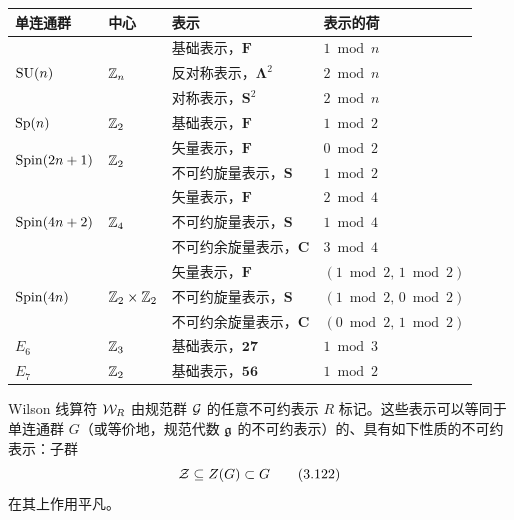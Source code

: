 
\begin{table}[htbp]
\centering
\small
\begin{tabular}{llll}
\toprule
单连通群 & 中心 & 表示 & 表示的荷 \\
\midrule
\multirow{3}{*}{$\mathrm{SU}(n)$} & \multirow{3}{*}{$\mathbb{Z}_n$}
  & 基础表示，$\bm{F}$ & $1 \bmod n$ \\
 & & 反对称表示，$\bm{\Lambda}^2$ & $2 \bmod n$ \\
 & & 对称表示，$\bm{S}^2$ & $2 \bmod n$ \\
\midrule
$\mathrm{Sp}(n)$ & $\mathbb{Z}_2$ & 基础表示，$\bm{F}$ & $1 \bmod 2$ \\
\midrule
\multirow{2}{*}{$\mathrm{Spin}(2n+1)$} & \multirow{2}{*}{$\mathbb{Z}_2$}
  & 矢量表示，$\bm{F}$ & $0 \bmod 2$ \\
 & & 不可约旋量表示，$\bm{S}$ & $1 \bmod 2$ \\
\midrule
\multirow{3}{*}{$\mathrm{Spin}(4n+2)$} & \multirow{3}{*}{$\mathbb{Z}_4$}
  & 矢量表示，$\bm{F}$ & $2 \bmod 4$ \\
 & & 不可约旋量表示，$\bm{S}$ & $1 \bmod 4$ \\
 & & 不可约余旋量表示，$\bm{C}$ & $3 \bmod 4$ \\
\midrule
\multirow{3}{*}{$\mathrm{Spin}(4n)$} & \multirow{3}{*}{$\mathbb{Z}_2\times\mathbb{Z}_2$}
  & 矢量表示，$\bm{F}$ & $(1 \bmod 2,\, 1 \bmod 2)$ \\
 & & 不可约旋量表示，$\bm{S}$ & $(1 \bmod 2,\, 0 \bmod 2)$ \\
 & & 不可约余旋量表示，$\bm{C}$ & $(0 \bmod 2,\, 1 \bmod 2)$ \\
\midrule
$E_6$ & $\mathbb{Z}_3$ & 基础表示，$\bm{27}$ & $1 \bmod 3$ \\
$E_7$ & $\mathbb{Z}_2$ & 基础表示，$\bm{56}$ & $1 \bmod 2$ \\
\bottomrule
\end{tabular}
\end{table}


Wilson 线算符 $\mathcal{W}_R$ 由规范群 $\mathcal{G}$ 的任意不可约表示 $R$ 标记。这些表示可以等同于单连通群 $G$（或等价地，规范代数 $\mathfrak{g}$ 的不可约表示）的、具有如下性质的不可约表示：子群
\begin{equation}
    \mathcal{Z} \subseteq Z(G) \subset G
    \tag{3.122}
\end{equation}
在其上作用平凡。

